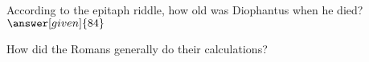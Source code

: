 \documentclass[nooutcomes]{ximera}
\begin{document}
\begin{question}
According to the epitaph riddle, how old was Diophantus when he died? $\answer[given]{84}$
\end{question}

\begin{question}
How did the Romans generally do their calculations?
\begin{multipleChoice}
\end{multipleChoice}
\end{question}


%
\end{document}
